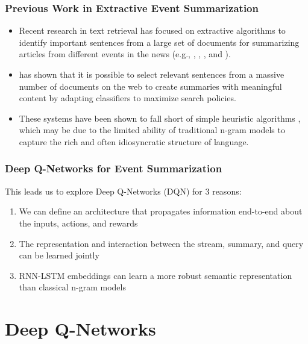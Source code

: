 \documentclass[]{beamer}
\begin{document}
\begin{frame}
	\frametitle{Previous Work in Extractive Event Summarization} 
	\begin{itemize}
		\item<1-> Recent research in text retrieval  has focused on extractive algorithms to identify important sentences from a large set of documents for summarizing articles from different events in the news (e.g., \cite{diazquery}, \cite{kedzie2015predicting}, \cite{garbacea2015university}, and \cite{kedzieextractive}).
		\item<1-> \cite{kedzie2015predicting}  has shown that it is possible to select relevant sentences from a massive number of documents on the web to create summaries with meaningful content by adapting classifiers to maximize search policies.
		\item<1-> These systems have been shown to  fall short of simple heuristic algorithms \cite{garbacea2015university}, which may be due to the limited ability of traditional n-gram models to capture the rich and often idiosyncratic structure of language.
	\end{itemize}

\end{frame}

\begin{frame}
	\frametitle{Deep Q-Networks for Event Summarization} 
This leads us to explore Deep Q-Networks (DQN) for 3 reasons: 
	 \vspace{-0.2cm} \begin{enumerate}
	\item <1-> We can define an architecture that propagates information end-to-end about the inputs, actions, and rewards 
	\item <1-> The representation and interaction between the stream, summary, and query can be learned jointly
	\item <1 -> RNN-LSTM embeddings can learn a more robust semantic representation than classical n-gram models
	\end{enumerate}
\end{frame}


\section{Deep Q-Networks}
\end{document}
